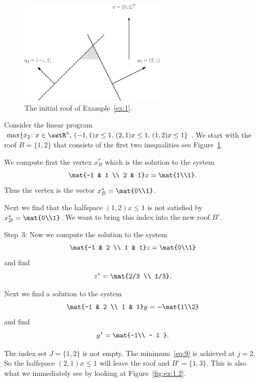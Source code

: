  \begin{figure}[htbp]
    \begin{center}
      \includegraphics[height=5cm]{figures/example.eps}
      \caption{The initial roof  of Example~\ref{ex:1}.}
        \label{fig:ex:1.1}
    \end{center}    
  \end{figure}


\begin{example}
  \label{ex:1}
    
  Consider the linear program $\max\{x_2 \colon x \in \setR^n, \, (-1,1) x \leq
  1,\,  (2,1)x\leq1,\, (1,2) x \leq1 \}$. We start with the roof $B =
  \{1,2\}$ that consists of the first two inequalities see 
  Figure~\ref{fig:ex:1.1}. 
  
  \noindent 
  We compute first the  vertex $x^*_B$  which is the solution to the
  system 
  \begin{equation}
    \label{eq:19}
    \mat{-1 & 1 \\ 2 & 1}  x  = \mat{1\\1}.
  \end{equation}
  Thus the  vertex is the vector $x_B^* = \mat{0\\1}$.  
  
  \noindent 
  Next  we find that the halfspace $(1,2) x \leq1$ is not satisfied
  by $x_B^* = \mat{0\\1}$. We want to bring this index   into the new
  roof $B'$.
  
  \noindent 
  Step~3:
  Now we compute the solution  to the system 
  \begin{equation}
    \label{eq:20}
    \mat{-1 & 2 \\ 1 & 1} z = \mat{0\\1}
  \end{equation}
  and  find 
  $$z^* = \mat{2/3 \\ 1/3}.$$  
  
  Next we find a solution  to the system  
   \begin{equation}
     \label{eq:21}
    \mat{-1 & 2 \\ 1 & 1} y  = - \mat{1\\2}
  \end{equation} 
  and find  
  $$y^* = \mat{-1\\ - 1 }. $$
  
  \noindent
  The index set $J = \{1,2\}$ is not empty. The minimum~\eqref{eq:9} is
  achieved at  $j =2$. So the halfspace 
  $(2,1)x\leq1$ will leave the roof and $B' = \{1,3\}$. 
  This is also what we immediately see by
  looking at Figure~\ref{fig:ex:1.2}. 
   
\end{example}

